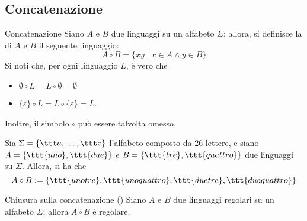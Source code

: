 \documentclass[a4paper, 12pt]{report}
\begin{document}
    \subsection{Concatenazione}

    \begin{frameddefn}{Concatenazione}
        Siano $A$ e $B$ due linguaggi su un alfabeto $\Sigma$; allora, si definisce la  di $A$ e $B$ il seguente linguaggio: $$A \circ B = \{xy \mid x \in A \land y \in B\}$$ Si noti che, per ogni linguaggio $L$, è vero che 

        \begin{itemize}
            \item $\emptyset \circ L = L \circ \emptyset = \emptyset$
            \item $\{\varepsilon \} \circ L = L \circ \{ \varepsilon \} = L$.
        \end{itemize}

        Inoltre, il simbolo $\circ$ può essere talvolta omesso.
    \end{frameddefn}

    \begin{example}[Concatenazione]
        Sia $\Sigma = \{\ttt a , \ldots, \ttt z\}$ l'alfabeto composto da 26 lettere, e siano $A = \{\ttt{uno}, \ttt{due}\}$ e $B = \{\ttt{tre}, \ttt{quattro}\}$ due linguaggi su $\Sigma$. Allora, si ha che $$A \circ B := \{\ttt{unotre}, \ttt{unoquattro}, \ttt{duetre}, \ttt{duequattro}\}$$
    \end{example}

    \begin{framedprop}[label={closure concat}]{Chiusura sulla concatenazione (\REG)}
        Siano $A$ e $B$ due linguaggi regolari su un alfabeto $\Sigma$; allora $A \circ B$ è regolare.
    \end{framedprop}
\end{document}
